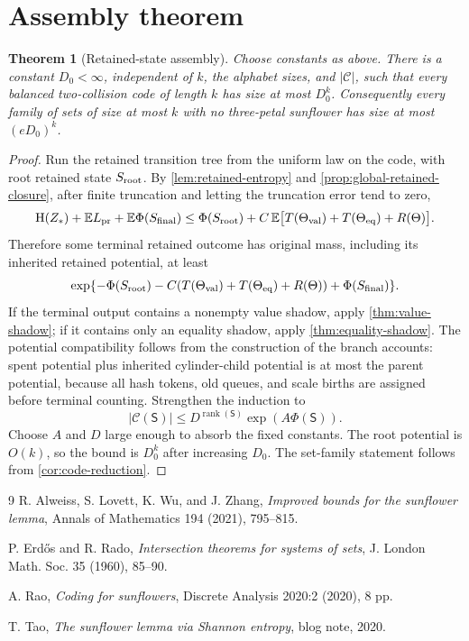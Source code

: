 \documentclass[11pt]{article}
\newcommand{\Cref}[1]{\ref{#1}}
\newtheorem{theorem}{Theorem}[section]
\theoremstyle{remark}
\newcommand{\C}{\mathcal C}
\newcommand{\E}{\mathbb E}
\newcommand{\HH}{\mathrm H}
\newcommand{\rank}{\operatorname{rank}}
\newcommand{\State}{\mathsf S}
\newcommand{\pr}{\mathrm{pr}}
\begin{document}
\section{Assembly theorem}

\begin{theorem}[Retained-state assembly]\label{thm:assembly}
Choose constants as above.  There is a constant $D_0<\infty$, independent of $k$, the alphabet sizes, and $|\C|$, such that every balanced two-collision code of length $k$ has size at most $D_0^k$.  Consequently every family of sets of size at most $k$ with no three-petal sunflower has size at most $(eD_0)^k$.
\end{theorem}

\begin{proof}
Run the retained transition tree from the uniform law on the code, with root retained state $S_{\rm root}$.  By \Cref{lem:retained-entropy} and \Cref{prop:global-retained-closure}, after finite truncation and letting the truncation error tend to zero,
\[
        \HH(Z_*)+\E L_{\pr}+\E\Phi(S_{\rm final})
        \le \Phi(S_{\rm root})
        +C\,\E\bigl[T(\Theta_{\rm val})+T(\Theta_{\rm eq})+R(\Theta)\bigr].
\]
Therefore some terminal retained outcome has original mass, including its inherited retained potential, at least
\[
        \exp\{-\Phi(S_{\rm root})-C(T(\Theta_{\rm val})+T(\Theta_{\rm eq})+R(\Theta))+\Phi(S_{\rm final})\}.
\]
If the terminal output contains a nonempty value shadow, apply \Cref{thm:value-shadow}; if it contains only an equality shadow, apply \Cref{thm:equality-shadow}.  The potential compatibility follows from the construction of the branch accounts: spent potential plus inherited cylinder-child potential is at most the parent potential, because all hash tokens, old queues, and scale births are assigned before terminal counting.  Strengthen the induction to
\[
        |\C(\State)|\le D^{\rank(\State)}\exp(A\Phi(\State)).
\]
Choose $A$ and $D$ large enough to absorb the fixed constants.  The root potential is $O(k)$, so the bound is $D_0^k$ after increasing $D_0$.  The set-family statement follows from \Cref{cor:code-reduction}.
\end{proof}
\begin{thebibliography}{9}
R. Alweiss, S. Lovett, K. Wu, and J. Zhang, \emph{Improved bounds for the sunflower lemma}, Annals of Mathematics 194 (2021), 795--815.

P. Erd\H{o}s and R. Rado, \emph{Intersection theorems for systems of sets}, J. London Math. Soc. 35 (1960), 85--90.

A. Rao, \emph{Coding for sunflowers}, Discrete Analysis 2020:2 (2020), 8 pp.

T. Tao, \emph{The sunflower lemma via Shannon entropy}, blog note, 2020.
\end{thebibliography}
\end{document}
